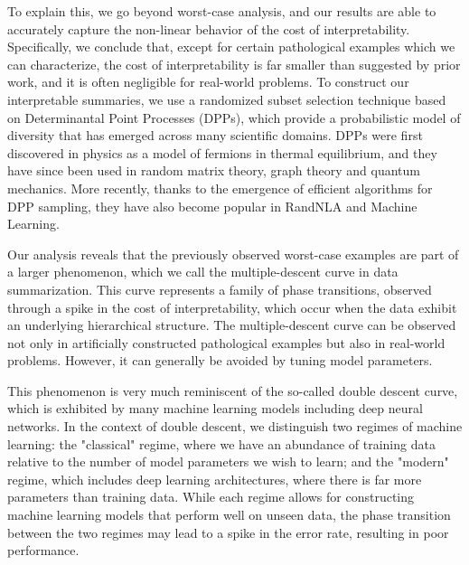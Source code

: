 \documentclass[11pt, oneside]{article}   	%
\begin{document}

To explain this, we go beyond worst-case analysis, and our results are
able to accurately capture the non-linear behavior of the cost of
interpretability. Specifically, we conclude that, except for certain
pathological examples which we can characterize, the cost of
interpretability is far smaller than suggested by prior work, and it
is often negligible for real-world problems. To construct our
interpretable summaries, we use a randomized subset selection
technique based on Determinantal Point Processes (DPPs), which provide
a probabilistic model of diversity that has emerged across many scientific domains.
DPPs were first discovered in physics as a model of fermions in thermal
equilibrium, and they have since been used in random matrix theory, graph
theory and quantum mechanics. More recently, thanks to the emergence
of efficient algorithms for DPP sampling, they have also become
popular in RandNLA and Machine Learning.

Our analysis reveals that
the previously observed worst-case examples are part of a larger
phenomenon, which we call the multiple-descent curve in data
summarization.  This curve represents a family of phase transitions,
observed through a spike in the cost of interpretability, which occur
when the data exhibit an underlying hierarchical structure. The
multiple-descent curve can be observed not only in artificially
constructed pathological examples but also in real-world
problems. However, it can generally be avoided by tuning model
parameters. 

This phenomenon is very much reminiscent of the so-called double
descent curve, which is exhibited by many machine learning models
including deep neural networks. In the context of double descent, we
distinguish two regimes of machine learning: the "classical" regime,
where we have an abundance of training data relative to the number of
model parameters we wish to learn; and the "modern" regime, which
includes deep learning architectures, where there is far more
parameters than training data. While each regime allows for
constructing machine learning models that perform well on unseen data,
the phase transition between the two regimes may lead to a spike in
the error rate, resulting in poor performance. 
\end{document}
